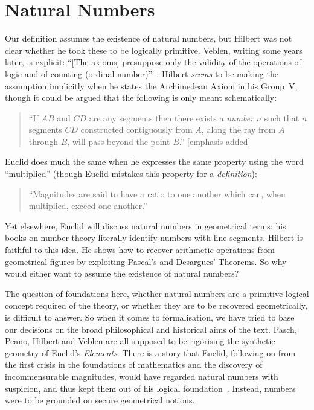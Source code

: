\section{Natural Numbers}
Our definition assumes the existence of natural numbers, but Hilbert was not clear whether he took these to be logically primitive. Veblen, writing some years later, is explicit: ``[The axioms] presuppose only the validity of the operations of logic and of counting (ordinal number)''~\cite[p. 344]{Veblenphd}. Hilbert \emph{seems} to be making the assumption implicitly when he states the Archimedean Axiom in his Group~V, though it could be argued that the following is only meant schematically:
\begin{quote}
  ``If $AB$ and $CD$ are any segments then there exists a \emph{number} $n$ such that $n$ segments $CD$ constructed contiguously from $A$, along the ray from $A$ through $B$, will pass beyond the point $B$.'' [emphasis added]
\end{quote}

Euclid does much the same when he expresses the same property using the word ``multiplied'' (though Euclid mistakes this property for a \emph{definition}):
\begin{quote}
  ``Magnitudes are said to have a ratio to one another which can, when multiplied, exceed one another.''
\end{quote}

Yet elsewhere, Euclid will discuss natural numbers in geometrical terms: his books on number theory literally identify numbers with line segments. Hilbert is faithful to this idea. He shows how to recover arithmetic operations from geometrical figures by exploiting Pascal's and Desargues' Theorems. So why would either want to assume the existence of natural numbers?

The question of foundations here, whether natural numbers are a primitive logical concept required of the theory, or whether they are to be recovered geometrically, is difficult to answer. So when it comes to formalisation, we have tried to base our decisions on the broad philosophical and historical aims of the text. Pasch, Peano, Hilbert and Veblen are all supposed to be rigorising the synthetic geometry of Euclid's \emph{Elements}. There is a story that Euclid, following on from the first crisis in the foundations of mathematics and the discovery of incommensurable magnitudes, would have regarded natural numbers with suspicion, and thus kept them out of his logical foundation~\cite{EvolutionEuclideanElements}. Instead, numbers were to be grounded on secure geometrical notions.

